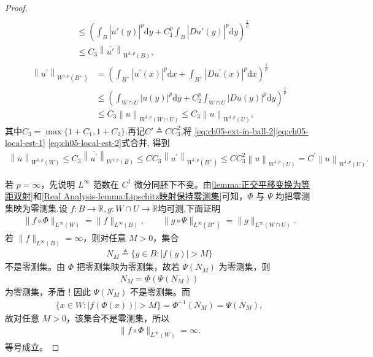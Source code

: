 \documentclass[../../main.tex]{subfiles}%
\begin{document}
\begin{proof}
\begin{align}
\\
&\leqslant \left( \int_B{\left| \overline{u'}\left( y \right) \right|^p\mathrm{d}y}+C_{1}^{p}\int_B{\left| D\overline{u'}\left( y \right) \right|^p\mathrm{d}y} \right) ^{\frac{1}{p}}\nonumber\\
&\leqslant C_3\left\| \overline{u'} \right\| _{W^{1,p}\left( B \right)},
\label{eq:ch05-local-est-1}
\end{align}
\begin{align}
\left\| u^{\prime} \right\| _{W^{1,p}\left( B^+ \right)}&=\left( \int_{B^+}{\left| u^{\prime}\left( x \right) \right|^p\mathrm{d}x}+\int_{B^+}{\left| Du^{\prime}\left( x \right) \right|^p\mathrm{d}x} \right) ^{\frac{1}{p}}
\nonumber\\
&\leqslant \left( \int_{W\cap U}{\left| u\left( y \right) \right|^p\mathrm{d}y}+C_{2}^{p}\int_{W\cap U}{\left| Du\left( y \right) \right|^p\mathrm{d}y} \right) ^{\frac{1}{p}}
\nonumber\\
&\leqslant C_3\left\| u \right\| _{W^{1,p}\left( W\cap U \right)}\leqslant C_3\left\| u \right\| _{W^{1,p}\left( U \right)},\label{eq:ch05-local-est-2}
\end{align}
其中$C_3=\max \{ 1+C_{1},1+C_{2}\}$.再记$C'\triangleq CC_3^2$,将 \eqref{eq:ch05-ext-in-ball-2}\eqref{eq:ch05-local-est-1} \eqref{eq:ch05-local-est-2}式合并, 得到
\begin{align}
\left\| \overline{u} \right\| _{W^{1,p}\left( W \right)}\leqslant C_3\left\| \overline{u^{\prime}} \right\| _{W^{1,p}\left( B \right)}\leqslant CC_3\left\| u^{\prime} \right\| _{W^{1,p}\left( B^+ \right)}\leqslant CC_{3}^{2}\left\| u \right\| _{W^{1,p}\left( U \right)}=C^{\prime}\left\| u \right\| _{W^{1,p}\left( U \right)}.\label{eq:ch05-local-est-final}
\end{align}

若 \(p=\infty\)，先说明 \(L^\infty\) 范数在 \(C^1\) 微分同胚下不变。由\cref{lemma:正交平移变换为等距双射}和\cref{Real Analysis-lemma:Lipschitz映射保持零测集}可知，\(\Phi\) 与 \(\Psi\) 均把零测集映为零测集.设 \(f:B\to\mathbb{R}\),$\,g:W\cap U\to \mathbb{R}$均可测,下面证明
\begin{align}\label{eq::jiowiowijoijoijijojsiosioios3829237489}
\|f\circ\Phi\|_{L^\infty(W)}=\|f\|_{L^\infty(B)},\qquad
\|g\circ\Psi\|_{L^\infty(B^+)}=\|g\|_{L^\infty(W\cap U)}.
\end{align}
若 \(\|f\|_{L^\infty(B)}=\infty\)，则对任意 \(M>0\)，集合
\begin{align*}
N_M\triangleq\{y\in B:|f(y)|>M\}
\end{align*}
不是零测集。由 \(\Phi\) 把零测集映为零测集，故若 \(\Psi(N_M)\) 为零测集，则
\begin{align*}
N_M=\Phi(\Psi(N_M))
\end{align*}
为零测集，矛盾！因此 \(\Psi(N_M)\) 不是零测集。而
\begin{align*}
\{x\in W:|f(\Phi(x))|>M\}=\Phi^{-1}(N_M)=\Psi(N_M),
\end{align*}
故对任意 \(M>0\)，该集合不是零测集，所以
\begin{align*}
\|f\circ\Phi\|_{L^\infty(W)}=\infty.
\end{align*}
等号成立。


\end{proof}
\end{document}
